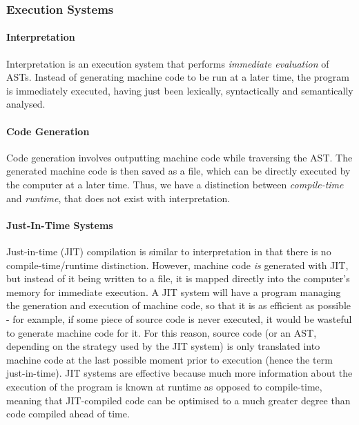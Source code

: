 \documentclass{article}
\begin{document}
\subsubsection{Execution Systems}
\paragraph{Interpretation \\}
Interpretation is an execution system that performs \emph{immediate evaluation} of ASTs. Instead of generating machine code to be run at a later time, the program is immediately executed, having just been lexically, syntactically and semantically analysed.

\paragraph{Code Generation \\}
Code generation involves outputting machine code while traversing the AST. The generated machine code is then saved as a file, which can be directly executed by the computer at a later time. Thus, we have a distinction between \emph{compile-time} and \emph{runtime}, that does not exist with interpretation.

\paragraph{Just-In-Time Systems \\}
Just-in-time (JIT) compilation is similar to interpretation in that there is no compile-time/runtime distinction. However, machine code \emph{is} generated with JIT, but instead of it being written to a file, it is mapped directly into the computer's memory for immediate execution. A JIT system will have a program managing the generation and execution of machine code, so that it is as efficient as possible - for example, if some piece of source code is never executed, it would be wasteful to generate machine code for it. For this reason, source code (or an AST, depending on the strategy used by the JIT system) is only translated into machine code at the last possible moment prior to execution (hence the term just-in-time). JIT systems are effective because much more information about the execution of the program is known at runtime as opposed to compile-time, meaning that JIT-compiled code can be optimised to a much greater degree than code compiled ahead of time.
\end{document}

